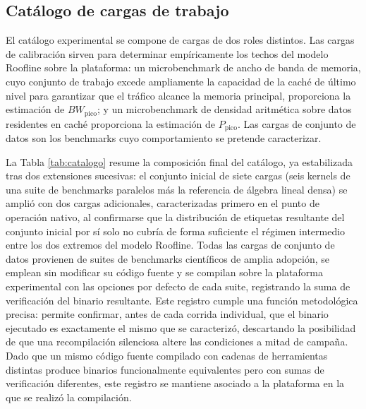 \documentclass[12pt,oneside,spanish]{book}
\begin{document}
\subsection{Catálogo de cargas de trabajo}

El catálogo experimental se compone de cargas de dos roles distintos. Las cargas de calibración sirven para determinar empíricamente los techos del modelo Roofline sobre la plataforma: un microbenchmark de ancho de banda de memoria, cuyo conjunto de trabajo excede ampliamente la capacidad de la caché de último nivel para garantizar que el tráfico alcance la memoria principal, proporciona la estimación de $BW_{\text{pico}}$; y un microbenchmark de densidad aritmética sobre datos residentes en caché proporciona la estimación de $P_{\text{pico}}$. Las cargas de conjunto de datos son los benchmarks cuyo comportamiento se pretende caracterizar.

La Tabla \ref{tab:catalogo} resume la composición final del catálogo, ya estabilizada tras dos extensiones sucesivas: el conjunto inicial de siete cargas (seis kernels de una suite de benchmarks paralelos más la referencia de álgebra lineal densa) se amplió con dos cargas adicionales, caracterizadas primero en el punto de operación nativo, al confirmarse que la distribución de etiquetas resultante del conjunto inicial por sí solo no cubría de forma suficiente el régimen intermedio entre los dos extremos del modelo Roofline. Todas las cargas de conjunto de datos provienen de suites de benchmarks científicos de amplia adopción, se emplean sin modificar su código fuente y se compilan sobre la plataforma experimental con las opciones por defecto de cada suite, registrando la suma de verificación del binario resultante. Este registro cumple una función metodológica precisa: permite confirmar, antes de cada corrida individual, que el binario ejecutado es exactamente el mismo que se caracterizó, descartando la posibilidad de que una recompilación silenciosa altere las condiciones a mitad de campaña. Dado que un mismo código fuente compilado con cadenas de herramientas distintas produce binarios funcionalmente equivalentes pero con sumas de verificación diferentes, este registro se mantiene asociado a la plataforma en la que se realizó la compilación.
\end{document}
